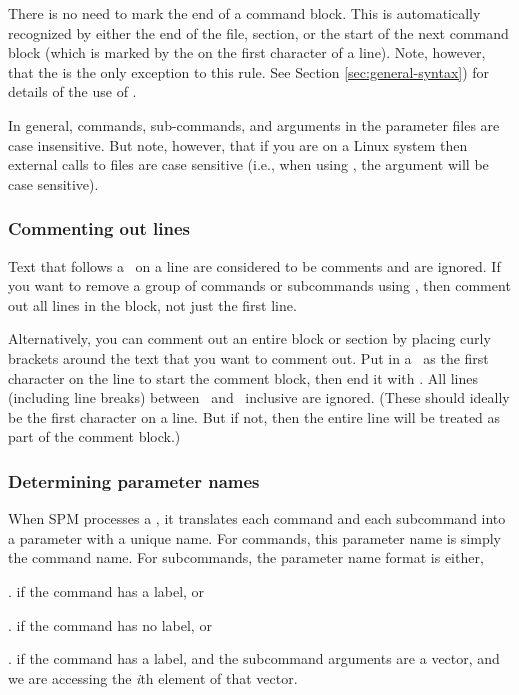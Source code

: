 There is no need to mark the end of a command block. This is automatically recognized by either the end of the file, section, or the start of the next command block (which is marked by the \command{} on the first character of a line). Note, however, that the  is the only exception to this rule. See Section \ref{sec:general-syntax}) for details of the use of . 

In general, commands, sub-commands, and arguments in the parameter files are case insensitive. But note, however, that if you are on a Linux system then external calls to files are case sensitive (i.e., when using  , the argument  will be case sensitive). 

\subsubsection{Commenting out lines}

Text that follows a \commentline\ on a line are considered to be comments and are ignored. If you want to remove a group of commands or subcommands using \commentline, then comment out all lines in the block, not just the first line. 

Alternatively, you can comment out an entire block or section by placing curly brackets around the text that you want to comment out. Put in a \commentstart\ as the first character on the line to start the comment block, then end it with \commentend. All lines (including line breaks) between \commentstart\ and \commentend\ inclusive are ignored. (These should ideally be the first character on a line. But if not, then the entire line will be treated as part of the comment block.)

\subsubsection{Determining parameter names}

When SPM processes a \config, it translates each command and each subcommand into a parameter with a unique name. For commands, this parameter name is simply the command name. For subcommands, the parameter name format is either, 

\begin{description}
\item {}\subcommand{[label]}. if the command has a label, or
\item {}. if the command has no label, or
\item {}\subcommand{[label]}.\subcommand{[i]} if the command has a label, and the subcommand arguments are a vector, and we are accessing the  \emph{i}th element of that vector. 
\end{description} 

